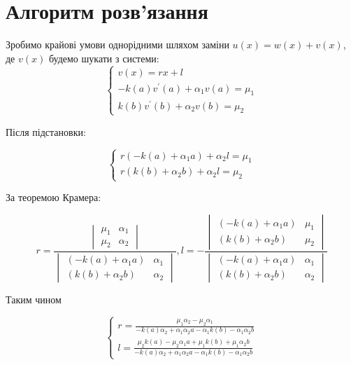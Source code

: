 \chapter{Алгоритм розв'язання}


Зробимо крайові умови однорідними шляхом заміни $u(x) = w(x) + v(x)$, 
де $v(x)$ будемо шукати з системи: 
$$
\begin{cases}
    v(x) = rx + l \\
    -k(a) v^{\prime}(a)+\alpha_1 v(a)=\mu_1 \\
    k(b) v^{\prime}(b)+\alpha_2 v(b)=\mu_2
\end{cases}
$$

Після підстановки:

$$
\begin{cases}
    r(-k(a) +\alpha_1 a) + \alpha_2 l =\mu_1 \\
    r(k(b) +\alpha_2 b) + \alpha_2 l =\mu_2
\end{cases}
$$


За теоремою Крамера: 



$$r = \frac{\begin{vmatrix}
            \mu_1 & \alpha_1 \\
            \mu_2 & \alpha_2
        \end{vmatrix}}{
        \begin{vmatrix}
            (-k(a) +\alpha_1 a) & \alpha_1 \\
            (k(b) +\alpha_2 b) & \alpha_2
        \end{vmatrix}},
l = -\frac{\begin{vmatrix}
            (-k(a) +\alpha_1 a) & \mu_1 \\
            (k(b) +\alpha_2 b) & \mu_2
        \end{vmatrix}}{
        \begin{vmatrix}
            (-k(a) +\alpha_1 a) & \alpha_1 \\
            (k(b) +\alpha_2 b) & \alpha_2 
        \end{vmatrix}}
$$

\pagebreak
Таким чином 


$$
\begin{cases}
    r = \frac{\mu_1\alpha_2 - \mu_2\alpha_1}{ -k(a)\alpha_2 + \alpha_1\alpha_2a - \alpha_1k(b) - \alpha_1\alpha_2b}\\ 
    l = \frac{\mu_2k(a) - \mu_2\alpha_1a + \mu_1k(b) +\mu_1\alpha_2b}{-k(a)\alpha_2 + \alpha_1\alpha_2a - \alpha_1k(b) - \alpha_1\alpha_2b}
\end{cases}
$$


